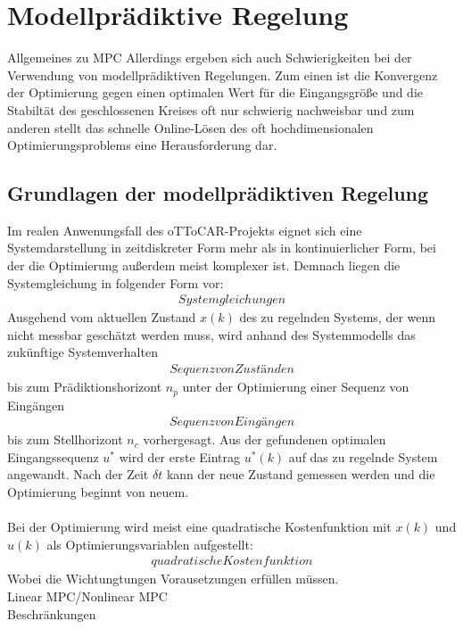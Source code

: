 \section{Modellprädiktive Regelung}
Allgemeines zu MPC
Allerdings ergeben sich auch Schwierigkeiten bei der Verwendung von modellprädiktiven Regelungen. Zum einen ist die Konvergenz der Optimierung gegen einen optimalen Wert für die Eingangsgröße und die Stabiltät des geschlossenen Kreises oft nur schwierig nachweisbar und zum anderen stellt das schnelle Online-Lösen des oft hochdimensionalen Optimierungsproblems eine Herausforderung dar.
\\
\subsection{Grundlagen der modellprädiktiven Regelung}
Im realen Anwenungsfall des oTToCAR-Projekts eignet sich eine Systemdarstellung in zeitdiskreter Form mehr als in kontinuierlicher Form, bei der die Optimierung außerdem meist komplexer ist. Demnach liegen die Systemgleichung in folgender Form vor:
\begin{align}
  Systemgleichungen
\end{align}
Ausgehend vom aktuellen Zustand $x(k)$ des zu regelnden Systems, der wenn nicht messbar geschätzt werden muss, wird anhand des Systemmodells das zukünftige Systemverhalten
\begin{align}
  Sequenz von Zuständen
\end{align}
bis zum Prädiktionshorizont $n_p$ unter der Optimierung einer Sequenz von Eingängen
\begin{align}
  Sequenz von Eingängen
\end{align}
bis zum Stellhorizont $n_c$ vorhergesagt. Aus der gefundenen optimalen Eingangssequenz $u^*$ wird der erste Eintrag $u^*(k)$ auf das zu regelnde System angewandt. Nach der Zeit $\delta t$ kann der neue Zustand gemessen werden und die Optimierung beginnt von neuem.\\ \\
Bei der Optimierung wird meist eine quadratische Kostenfunktion mit $x(k)$ und $u(k)$ als Optimierungsvariablen aufgestellt:
\begin{align}
  quadratische Kostenfunktion
\end{align}
Wobei die Wichtungtungen Vorausetzungen erfüllen müssen.\\
Linear MPC/Nonlinear MPC\\
Beschränkungen
